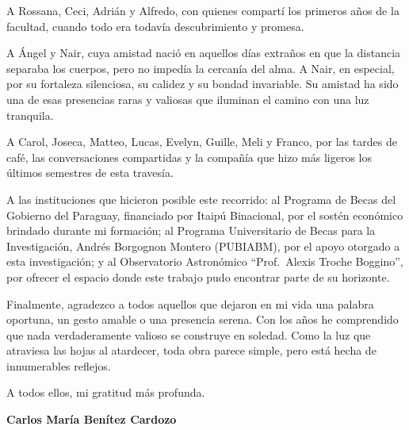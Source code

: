\begin{flushright}
A Rossana, Ceci, Adrián y Alfredo, con quienes compartí los primeros años de la facultad, cuando todo era todavía descubrimiento y promesa.

A Ángel y Nair, cuya amistad nació en aquellos días extraños en que la distancia separaba los cuerpos, pero no impedía la cercanía del alma. A Nair, en especial, por su fortaleza silenciosa, su calidez y su bondad invariable. Su amistad ha sido una de esas presencias raras y valiosas que iluminan el camino con una luz tranquila.

A Carol, Joseca, Matteo, Lucas, Evelyn, Guille, Meli y Franco, por las tardes de café, las conversaciones compartidas y la compañía que hizo más ligeros los últimos semestres de esta travesía.

A las instituciones que hicieron posible este recorrido: al Programa de Becas del Gobierno del Paraguay, financiado por Itaipú Binacional, por el sostén económico brindado durante mi formación; al  Programa Universitario de Becas para la Investigación, Andrés Borgognon Montero (PUBIABM), por el apoyo otorgado a esta investigación; y al Observatorio Astronómico ``Prof.~Alexis Troche Boggino'', por ofrecer el espacio donde este trabajo pudo encontrar parte de su horizonte.

Finalmente, agradezco a todos aquellos que dejaron en mi vida una palabra oportuna, un gesto amable o una presencia serena. Con los años he comprendido que nada verdaderamente valioso se construye en soledad. Como la luz que atraviesa las hojas al atardecer, toda obra parece simple, pero está hecha de innumerables reflejos.

A todos ellos, mi gratitud más profunda.

\textbf{Carlos María Benítez Cardozo}

\end{flushright}

\bigskip